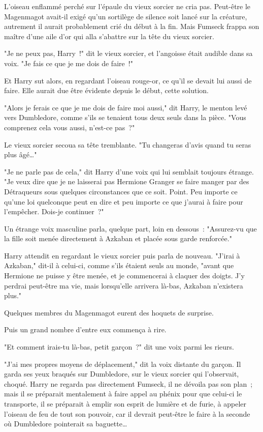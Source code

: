 L'oiseau enflammé perché sur l'épaule du vieux sorcier ne cria pas. Peut-être le Magenmagot avait-il exigé qu'un sortilège de silence soit lancé sur la créature, autrement il aurait probablement crié du début à la fin. Mais Fumseck frappa son maître d'une aile d'or qui alla s'abattre sur la tête du vieux sorcier.

"Je ne peux pas, Harry~!" dit le vieux sorcier, et l'angoisse était audible dans sa voix. "Je fais ce que je me dois de faire~!"

Et Harry sut alors, en regardant l'oiseau rouge-or, ce qu'il se devait lui aussi de faire. Elle aurait due être évidente depuis le début, cette solution.

"Alors je ferais ce que je me dois de faire moi aussi," dit Harry, le menton levé vers Dumbledore, comme s'ils se tenaient tous deux seuls dans la pièce. "Vous comprenez cela vous aussi, n'est-ce pas~?"

Le vieux sorcier secoua sa tête tremblante. "Tu changeras d'avis quand tu seras plus âgé…"

"Je ne parle pas de cela," dit Harry d'une voix qui lui semblait toujours étrange. "Je veux dire que je ne laisserai pas Hermione Granger se faire manger par des Détraqueurs sous quelques circonstances que ce soit. Point. Peu importe ce qu'une loi quelconque peut en dire et peu importe ce que j'aurai à faire pour l'empêcher. Dois-je continuer~?"

Un étrange voix masculine parla, quelque part, loin en dessous~: "Assurez-vu que la fille soit menée directement à Azkaban et placée sous garde renforcée."

Harry attendit en regardant le vieux sorcier puis parla de nouveau. "J'irai à Azkaban," dit-il à celui-ci, comme s'ils étaient seuls au monde, "avant que Hermione ne puisse y être menée, et je commencerai à claquer des doigts. J'y perdrai peut-être ma vie, mais lorsqu'elle arrivera là-bas, Azkaban n'existera plus."

Quelques membres du Magenmagot eurent des hoquets de surprise.

Puis un grand nombre d'entre eux commença à rire.

"Et comment irais-tu là-bas, petit garçon~?" dit une voix parmi les rieurs.

"J'ai mes propres moyens de déplacement," dit la voix distante du garçon. Il garda ses yeux braqués sur Dumbledore, sur le vieux sorcier qui l'observait, choqué. Harry ne regarda pas directement Fumseck, il ne dévoila pas son plan~; mais il se préparait mentalement à faire appel au phénix pour que celui-ci le transporte, il se préparait à emplir son esprit de lumière et de furie, à appeler l'oiseau de feu de tout son pouvoir, car il devrait peut-être le faire à la seconde où Dumbledore pointerait sa baguette…

